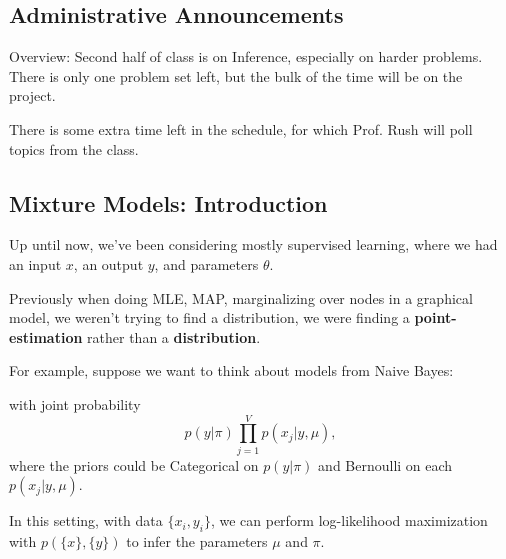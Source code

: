 \documentclass{article}
\begin{document}


\subsection{Administrative Announcements}

Overview:  Second half of class is on Inference, especially on harder problems.  There is only one problem set left, but the bulk of the time will be on the project.

There is some extra time left in the schedule, for which Prof. Rush will poll topics from the class.

\subsection{Mixture Models: Introduction}

Up until now, we've been considering mostly supervised learning, where we had an input $x$, an output $y$, and parameters $\theta$.

Previously when doing MLE, MAP, marginalizing over nodes in a graphical model, we weren't trying to find a distribution, we were finding a {\bf point-estimation} rather than a {\bf distribution}.

For example, suppose we want to think about models from Naive Bayes:


\begin{center}
\end{center}

with joint probability $$\displaystyle p(y | \pi) \prod_{j= 1}^V p(x_j | y, \mu),$$ where the priors could be Categorical on $p(y | \pi)$ and Bernoulli on each $p(x_j | y, \mu)$.  

In this setting, with data $\{x_i, y_i\}$, we can perform log-likelihood maximization with $p(\{x\}, \{y\})$ to infer the parameters $\mu$ and $\pi$.
\end{document}
